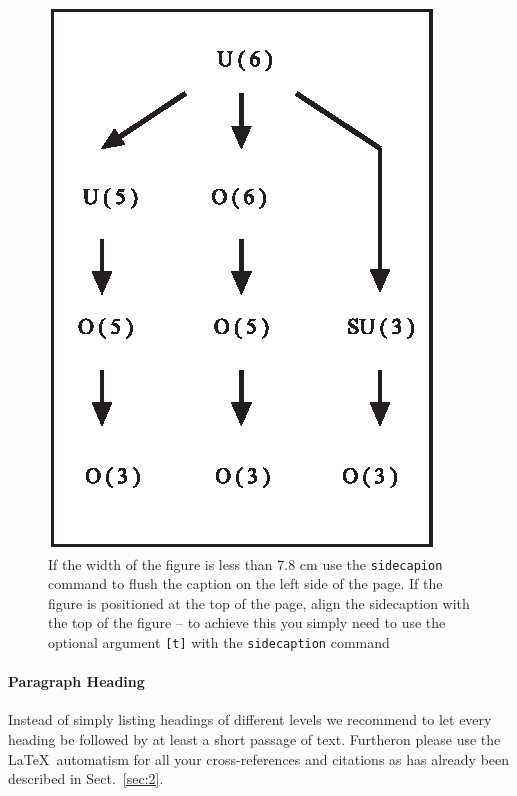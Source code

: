 %
\begin{figure}[b]
\sidecaption
\includegraphics[scale=.65]{figure}
%
%
\caption{If the width of the figure is less than 7.8 cm use the \texttt{sidecapion} command to flush the caption on the left side of the page. If the figure is positioned at the top of the page, align the sidecaption with the top of the figure -- to achieve this you simply need to use the optional argument \texttt{[t]} with the \texttt{sidecaption} command}
\label{fig:1}       %
\end{figure}


\paragraph{Paragraph Heading} %
Instead of simply listing headings of different levels we recommend to let every heading be followed by at least a short passage of text. Furtheron please use the \LaTeX\ automatism for all your cross-references and citations as has already been described in Sect.~\ref{sec:2}.

